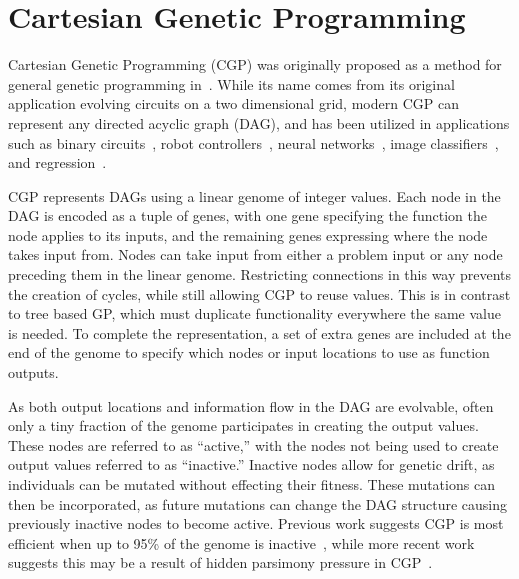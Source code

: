 \documentclass[journal]{IEEEtran}
\begin{document}

\section{Cartesian Genetic Programming}
\label{sec:cgp}
Cartesian Genetic Programming (CGP) was originally proposed as a method for general
genetic programming in~\cite{miller:2000:CGPorigin}.  While its name comes from
its original application evolving circuits on a two dimensional grid, modern CGP can
represent any directed acyclic graph (DAG), and has been utilized in applications such as binary
circuits~\cite{walker:2008:cgpmodules},
robot controllers~\cite{harding:2005:robots},
neural networks~\cite{khan:2010:cgpann},
image classifiers~\cite{harding:2012:mtcgp},
and regression~\cite{harding:2009:smcgp}.

CGP represents DAGs using a linear genome of integer values.  Each node in the
DAG is encoded as a tuple of genes, with one gene specifying the function
the node applies to its inputs, and the remaining genes expressing where the
node takes input from.  Nodes can take input from either a problem input or
any node preceding them in the linear genome.  Restricting connections in this way
prevents the creation of cycles, while still allowing CGP to reuse values.  This is
in contrast to tree based GP, which must duplicate functionality everywhere the same value is needed.
To complete the representation, a set
of extra genes are included at the end of the genome to specify which nodes or
input locations to use as function outputs.

As both output locations and information flow in the DAG are evolvable, often
only a tiny fraction of the genome participates in creating the
output values.  These nodes are referred to as ``active,'' with the nodes not
being used to create output values referred to as ``inactive.''  Inactive nodes
allow for genetic drift, as individuals can be mutated without effecting
their fitness.  These mutations can then be incorporated, as future
mutations can change the DAG structure causing previously inactive nodes to become
active.  Previous work suggests CGP is most efficient when up to 95\% of the genome
is inactive~\cite{miller:2006:redundancy}, while more recent work suggests this may
be a result of hidden parsimony pressure in CGP~\cite{goldman:2013:ordering}.
\end{document}
